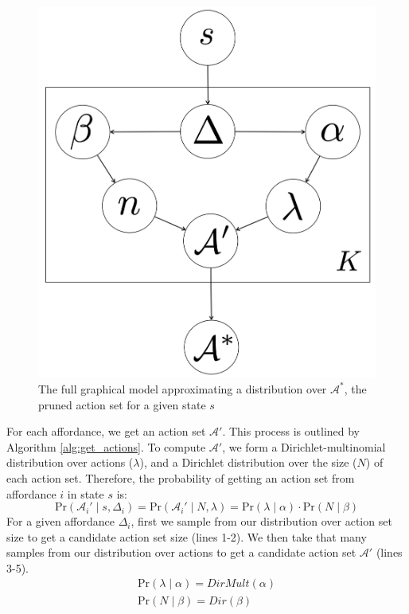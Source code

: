 \documentclass[conference]{IEEEtran}
\newcommand{\gnote}[1]{\textcolor{Purple}{\textbf{G: #1}}}
\begin{document}
\begin{figure}
\centering
\includegraphics[scale=0.14]{figures/learn_graphical_model.png}%
  \caption{The full graphical model approximating a distribution over $\mathcal{A}^*$, the pruned action set for a given state $s$}
  \label{fig:graphical_model}
\end{figure}

For each affordance, we get an action set $\mathcal{A}'$. This 
process is outlined by Algorithm \ref{alg:get_actions}. To compute $\mathcal{A}'$, we form a Dirichlet-multinomial distribution
over actions ($\lambda$), and a Dirichlet distribution over the size ($N$) of each action set. Therefore, the probability of getting an action set from affordance $i$ in state $s$ is:
\begin{equation}
\text{Pr}(\mathcal{A}_i' \mid s,\Delta_i) = \text{Pr}(\mathcal{A}_i' \mid N, \lambda) = \text{Pr}(\lambda \mid \alpha) \cdot \text{Pr}(N \mid \beta)
\end{equation}
For a given affordance $\Delta_i$, first we sample from our distribution over action set size to get a candidate action set size (lines 1-2). We then
take that many samples from our distribution over actions to get a candidate action set $\mathcal{A}'$ (lines 3-5).
\begin{align}
\text{Pr}(\lambda \mid \alpha) = DirMult(\alpha) \\
\text{Pr}(N \mid \beta) = Dir(\beta)
\end{align}
\end{document}
